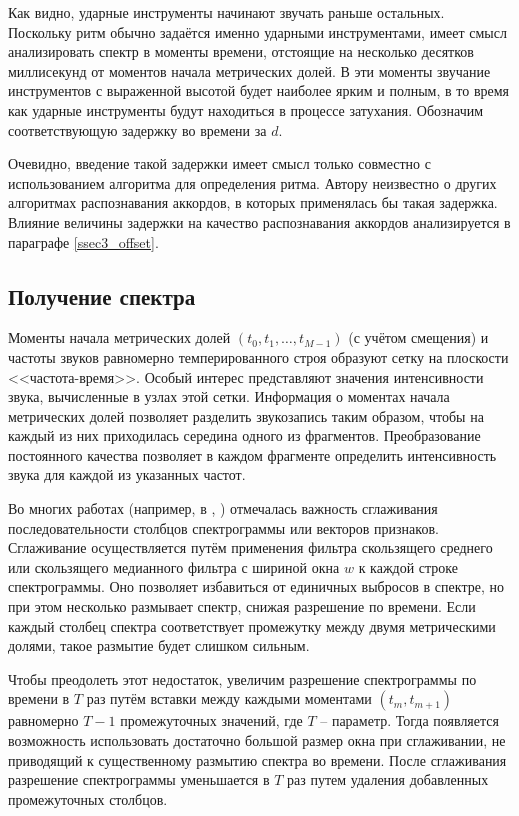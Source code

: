 Как видно, ударные инструменты начинают звучать раньше остальных. Поскольку ритм
обычно задаётся именно ударными инструментами, имеет смысл анализировать спектр
в моменты времени, отстоящие на несколько десятков миллисекунд от моментов
начала метрических долей. В эти моменты звучание инструментов с выраженной
высотой будет наиболее ярким и полным, в то время как ударные инструменты будут
находиться в процессе затухания. Обозначим соответствующую задержку во времени
за $d$.

Очевидно, введение такой задержки имеет смысл только совместно с использованием
алгоритма для определения ритма. Автору неизвестно о других алгоритмах
распознавания аккордов, в которых применялась бы такая задержка. Влияние
величины задержки на качество распознавания аккордов анализируется в параграфе
\ref{ssec3_offset}.

\subsection{Получение спектра} \label{ssect1_spectrum}

Моменты начала метрических долей $(t_0, t_1, \ldots, t_{M-1})$ (с учётом
смещения) и частоты звуков равномерно темперированного строя образуют сетку на
плоскости <<частота-время>>. Особый интерес представляют значения интенсивности
звука, вычисленные в узлах этой сетки. Информация о моментах начала метрических
долей позволяет разделить звукозапись таким образом, чтобы на каждый из них
приходилась середина одного из фрагментов. Преобразование постоянного качества
позволяет в каждом фрагменте определить интенсивность звука для каждой из
указанных частот.

Во многих работах (например, в \cite{Jiang2011}, \cite{Cho2011}) отмечалась
важность сглаживания последовательности столбцов спектрограммы или векторов
признаков. Сглаживание осуществляется путём применения фильтра скользящего
среднего или скользящего медианного фильтра с шириной окна $w$ к каждой строке
спектрограммы. Оно позволяет избавиться от единичных выбросов в спектре, но при
этом несколько размывает спектр, снижая разрешение по времени. Если каждый
столбец спектра соответствует промежутку между двумя метрическими долями, такое
размытие будет слишком сильным.

Чтобы преодолеть этот недостаток, увеличим разрешение спектрограммы по времени в
$T$ раз путём вставки между каждыми моментами $(t_m, t_{m+1})$ равномерно $T-1$
промежуточных значений, где $T$ -- параметр. Тогда появляется возможность
использовать достаточно большой размер окна при сглаживании, не приводящий к
существенному размытию спектра во времени. После сглаживания разрешение
спектрограммы уменьшается в $T$ раз путем удаления добавленных промежуточных
столбцов.

